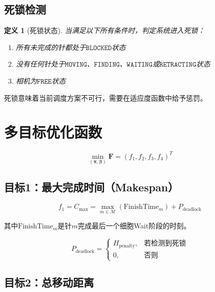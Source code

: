 \documentclass[11pt,a4paper]{article}
\newtheorem{definition}{定义}[section]
\begin{document}
\subsection{死锁检测}

\begin{definition}[死锁状态]
当满足以下所有条件时，判定系统进入死锁：
\begin{enumerate}
    \item 所有未完成的针都处于$\texttt{BLOCKED}$状态
    \item 没有任何针处于$\texttt{MOVING}$、$\texttt{FINDING}$、$\texttt{WAITING}$或$\texttt{RETRACTING}$状态
    \item 相机为$\texttt{FREE}$状态
\end{enumerate}
\end{definition}

死锁意味着当前调度方案不可行，需要在适应度函数中给予惩罚。

\section{多目标优化函数}

\begin{equation}
    \min_{(\boldsymbol{\pi}, \boldsymbol{\beta})} \mathbf{F} = (f_1, f_2, f_3, f_4)^T
\end{equation}

\subsection{目标1：最大完成时间（Makespan）}

\begin{equation}
    f_1 = C_{\max} = \max_{m \in \mathcal{M}} \left( \text{FinishTime}_m \right) + P_{\text{deadlock}}
\end{equation}

其中$\text{FinishTime}_m$是针$m$完成最后一个细胞Wait阶段的时刻。

\begin{equation}
    P_{\text{deadlock}} = \begin{cases}
    H_{\text{penalty}}, & \text{若检测到死锁} \\
    0, & \text{否则}
    \end{cases}
\end{equation}

\subsection{目标2：总移动距离}
\end{document}
